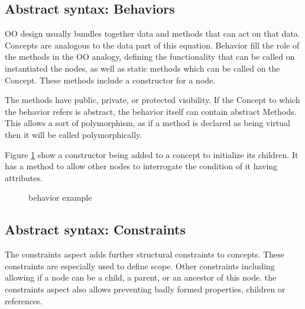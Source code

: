 \subsection{Abstract syntax: Behaviors}
OO design usually bundles together data and methods that can act on that data.
Concepts are analogous to the data part of this equation.
Behavior fill the role of the methods in the OO analogy, defining the functionality that can be called on instantiated the nodes, as well as static methods which can be called on the Concept.
These methods include a constructor for a node.

The methods have public, private, or protected visibility.
If the Concept to which the behavior refers is abstract, the behavior itself can contain abstract Methods.
This allows a sort of polymorphism, as if a method is declared as being virtual then it will be called polymorphically.

Figure \ref{fig:behavior_example} show a constructor being added to a concept to initialize its children.
It has a method to allow other nodes to interrogate the condition of it having attributes.

\begin{figure}[h]
    \centering
    \caption{behavior example}
    \label{fig:behavior_example}
\end{figure}
 

\subsection{Abstract syntax: Constraints}
The constraints aspect adds further structural constraints to concepts.
These constraints are especially used to define scope.
Other constraints including allowing if a node can be a child, a parent, or an ancestor of this node.
the constraints aspect also allows preventing badly formed properties, children or references.

